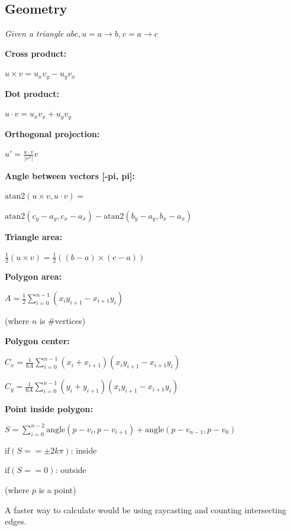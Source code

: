 \documentclass[8pt,a4paper,landscape,oneside]{amsart}
\begin{document}
\begin{multicols*}{3}
  \subsection{Geometry}
  \textit{Given a triangle $\mathit{abc, u = a \rightarrow b, v = a \rightarrow c}$}

  \textbf{Cross product:} 

  $u \times v = u_xv_y - u_yv_x$
  \newline

  \textbf{Dot product:} 

  $u \cdot v = u_xv_x + u_yv_y$
  \newline

  \textbf{Orthogonal projection:} 

  $u' = \frac{u \cdot v}{|v^2|}v$
  \newline

  \textbf{Angle between vectors [-pi, pi]:} 

  $\mathrm{atan2} (u \times v, u \cdot v) = $

  $\mathrm{atan2} (c_y - a_y, c_x - a_x) - \mathrm{atan2} (b_y - a_y, b_x - a_x)$
  \newline

  \textbf{Triangle area:} 

  $\frac{1}{2}(u \times v) = \frac{1}{2}((b-a) \times (c-a))$
  \newline

  \textbf{Polygon area:} 

  $A = \frac{1}{2}\sum\limits^{n-1}_{i=0}(x_iy_{i+1}-x_{i+1}y_i)$

  (where $n$ is \#vertices)
  \newline

  \textbf{Polygon center:}

  $C_x = \frac{1}{6A}\sum\limits^{n-1}_{i=0}(x_i+x_{i+1})(x_iy_{i+1}-x_{i+1}y_i)$

  $C_y = \frac{1}{6A}\sum\limits^{n-1}_{i=0}(y_i+y_{i+1})(x_iy_{i+1}-x_{i+1}y_i)$
  \newline

  \textbf{Point inside polygon:} 

  $S = \sum\limits^{n-2}_{i=0}\mathrm{angle}(p - v_i, p - v_{i+1}) + \mathrm{angle}(p - v_{n-1}, p - v_0)$

  $\mathrm{if} (S == \pm 2k\pi)$: inside

  $\mathrm{if} (S == 0)$: outside

  (where $p$ is a point)

  A faster way to calculate would be using raycasting and counting intersecting edges.
  

\end{multicols*}
\end{document}
